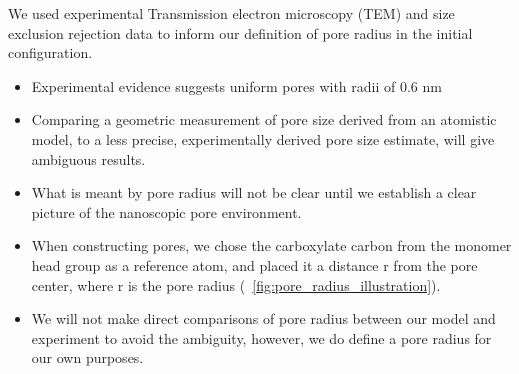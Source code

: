 \documentclass{article}
\begin{document}
  We used experimental Transmission electron microscopy (TEM) and size exclusion rejection
  data \cite{feng_scalable_2014,feng_thin_2016,zhou_supported_2005} to inform our definition
  of pore radius in the initial configuration.
  \begin{itemize}
    \item Experimental evidence suggests uniform pores with radii of 0.6 nm 
    \item Comparing a geometric measurement of pore size derived from an atomistic model,
    to a less precise, experimentally derived pore size estimate, will give ambiguous results.
    \item What is meant by pore radius will not be clear until we establish a clear picture
    of the nanoscopic pore environment.
    \item When constructing pores, we chose the carboxylate carbon from the monomer
    head group as a reference atom, and placed it a distance r from the pore center,
    where r is the pore radius (~\ref{fig:pore_radius_illustration}). %
    \item We will not make direct comparisons of pore radius between our model 
    and experiment to avoid the ambiguity, however, we do define a pore radius  
    for our own purposes.
  \end{itemize}
\end{document}

